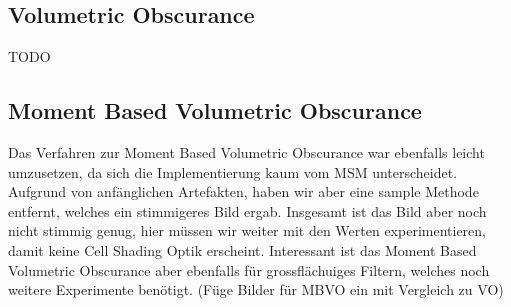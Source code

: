 \documentclass[runningheaders,a4paper]{llncs}
\begin{document}
\subsection{Volumetric Obscurance}
TODO

\subsection{Moment Based Volumetric Obscurance}
Das Verfahren zur Moment Based Volumetric Obscurance war ebenfalls leicht umzusetzen, da sich die Implementierung kaum vom MSM unterscheidet. Aufgrund von anfänglichen Artefakten, haben wir aber eine sample Methode entfernt, welches ein stimmigeres Bild ergab. Insgesamt ist das Bild aber noch nicht stimmig genug, hier müssen wir weiter mit den Werten experimentieren, damit keine Cell Shading Optik erscheint. Interessant ist das Moment Based Volumetric Obscurance aber ebenfalls für grossflächuiges Filtern, welches noch weitere Experimente benötigt.
(Füge Bilder für MBVO ein mit Vergleich zu VO)





\end{document}
